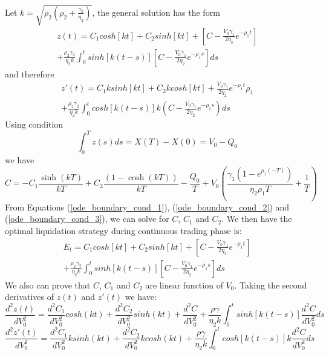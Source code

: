 \documentclass{article}
\begin{document}
Let $k=\sqrt{\rho_2 \left(\rho_2 + \frac{\gamma_2}{\eta_2}\right)}$, the general solution has the form
\begin{equation}
\begin{split}
z(t) = C_1 cosh[k t]+ C_2  sinh[k t] + [C- \frac{V_0 \gamma_1}{2 \eta_2} e^{-\rho_1 t}] \\
+ \frac{\rho_2 \gamma_2}{\eta_2 k}\int_0^t sinh[k(t-s)] [C- \frac{V_0 \gamma_1}{2 \eta_2} e^{-\rho_1 s}]ds
\end{split}
\end{equation}
and therefore
\begin{equation}
\begin{split}
z'(t) = C_1 k  sinh[k t]+ C_2 k cosh[k t] + \frac{V_0 \gamma_1}{2 \eta_2} e^{-\rho_1 t} \rho_1 \\
+ \frac{\rho_2 \gamma_2}{\eta_2 k}\int_0^t cosh[k(t-s)] k (C- \frac{V_0 \gamma_1}{2 \eta_2} e^{-\rho_1 s})ds
\end{split}
\end{equation}
Using condition
\[
\int_0^T z(s) ds = X(T) - X(0) = V_0 - Q_0
\]
we have
\begin{equation}\label{ode_boundary_cond_3}
C = -C_1 \frac{ \sinh (k T)}{k T}+C_2 \frac{(1-\cosh (k T))}{k T}-\frac{Q_0}{T}+V_0 \left(\frac{\gamma_1 \left(1-e^{\rho_1 (-T)}\right)}{\eta_2 \rho_1
   T}+\frac{1}{T}\right)
\end{equation}
From Equations (\ref{ode_boundary_cond_1}), (\ref{ode_boundary_cond_2}) and (\ref{ode_boundary_cond_3}), we can solve for $C$, $C_1$ and $C_2$. We then have the optimal liquidation strategy during continuous trading phase is:
\[
\begin{split}
E_t = C_1 cosh[k t]+ C_2  sinh[k t] + [C- \frac{V_0 \gamma_1}{2 \eta_2} e^{-\rho_1 t}] \\
+ \frac{\rho_2 \gamma_2}{\eta_2 k}\int_0^t sinh[k(t-s)] [C- \frac{V_0 \gamma_1}{2 \eta_2} e^{-\rho_1 s}]ds
\end{split}
\]
We also can prove that $C$, $C_1$ and $C_2$ are linear function of $V_0$. Taking the second derivatives of $z(t)$ and $z'(t)$ we have:
\[
\frac{d^2z(t)}{dV_0^2} = \frac{d^2C_1}{dV_0^2} cosh(kt) + \frac{d^2C_2}{dV_0^2} sinh(kt) + \frac{d^2C}{dV_0^2} + \frac{\rho \gamma}{\eta_2 k}\int_0^t sinh[k(t-s)] \frac{d^2C}{dV_0^2} ds
\]
\[
\frac{d^2z'(t)}{dV_0^2} = \frac{d^2C_1}{dV_0^2} k sinh(kt) + \frac{d^2C_2}{dV_0^2} k cosh(kt) + \frac{\rho \gamma}{\eta_2 k}\int_0^t cosh[k(t-s)] k \frac{d^2C}{dV_0^2} ds
\]
\end{document}
